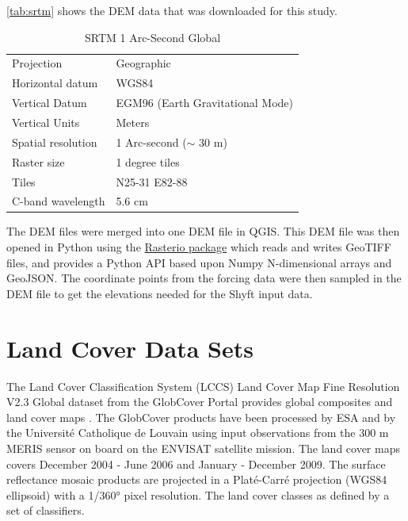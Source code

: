 \autoref{tab:srtm} shows the DEM data that was downloaded for this study.

\begin{table}[ht]
\centering
\caption{SRTM 1 Arc-Second Global}
\label{tab:srtm}
\begin{tabular}{ll}
\toprule
Projection                        & Geographic                       \\
Horizontal datum                  & WGS84                            \\
Vertical Datum                    & EGM96 (Earth Gravitational Mode) \\
Vertical Units                    & Meters                           \\
Spatial resolution                & 1 Arc-second ($\sim$ 30 m)       \\
Raster size                       & 1 degree tiles                   \\
Tiles                             & N25-31 E82-88                    \\
C-band wavelength                 & 5.6 cm                           \\ 
\bottomrule
\end{tabular}
\end{table}

The DEM files were merged into one DEM file in QGIS. This DEM file was then opened in Python using the  \href{https://rasterio.readthedocs.io/en/latest/index.html}{Rasterio package} which reads and writes GeoTIFF files, and provides a Python API based upon Numpy N-dimensional arrays and GeoJSON. The coordinate points from the forcing data were then sampled in the DEM file to get the elevations needed for the Shyft input data.

\section{Land Cover Data Sets}

The Land Cover Classification System (LCCS) Land Cover Map Fine Resolution V2.3 Global dataset from the GlobCover Portal provides global composites and land cover maps \parencite{bontemps_globcover_2011}. The GlobCover products have been processed by ESA and by the Université Catholique de Louvain using input observations from the 300 m MERIS sensor on board on the ENVISAT satellite mission. The land cover maps covers December 2004 - June 2006 and January - December 2009. The surface reflectance mosaic products are projected in a Platé-Carré projection (WGS84 ellipsoid) with a 1/360° pixel resolution. The land cover classes as defined by a set of classifiers. 

